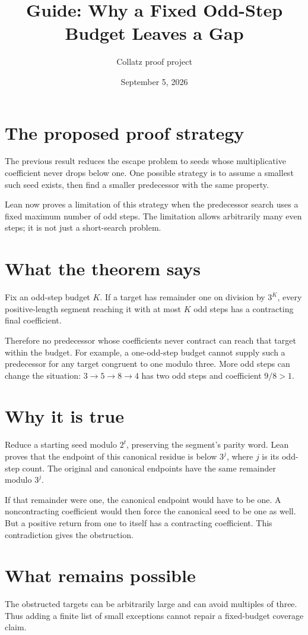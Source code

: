 \documentclass[10pt]{article}
\title{Guide: Why a Fixed Odd-Step Budget Leaves a Gap}
\author{Collatz proof project}
\date{September 5, 2026}
\begin{document}
\maketitle
\section*{The proposed proof strategy}
The previous result reduces the escape problem to seeds whose multiplicative
coefficient never drops below one. One possible strategy is to assume a
smallest such seed exists, then find a smaller predecessor with the same
property.

Lean now proves a limitation of this strategy when the predecessor search
uses a fixed maximum number of odd steps. The limitation allows arbitrarily
many even steps; it is not just a short-search problem.

\section*{What the theorem says}
Fix an odd-step budget $K$. If a target has remainder one on division by
$3^K$, every positive-length segment reaching it with at most $K$ odd steps
has a contracting final coefficient.

Therefore no predecessor whose coefficients never contract can reach that
target within the budget. For example, a one-odd-step budget cannot supply
such a predecessor for any target congruent to one modulo three. More odd
steps can change the situation: $3\to5\to8\to4$ has two odd steps and
coefficient $9/8>1$.

\section*{Why it is true}
Reduce a starting seed modulo $2^t$, preserving the segment's parity word.
Lean proves that the endpoint of this canonical residue is below $3^j$,
where $j$ is its odd-step count. The original and canonical endpoints have
the same remainder modulo $3^j$.

If that remainder were one, the canonical endpoint would have to be one.
A noncontracting coefficient would then force the canonical seed to be one
as well. But a positive return from one to itself has a contracting
coefficient. This contradiction gives the obstruction.

\section*{What remains possible}
The obstructed targets can be arbitrarily large and can avoid multiples
of three. Thus adding a finite list of small exceptions cannot repair a
fixed-budget coverage claim.
\end{document}
